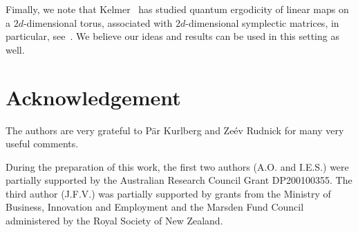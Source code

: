 \documentclass[12pt]{amsart}
\begin{document}
Fimally, we note that Kelmer~\cite{Kel}  has studied  quantum ergodicity of linear maps on a  $2d$-dimensional  torus, associated with   $2d$-dimensional symplectic 
matrices, in particular, see~\cite[Propositions~3.5 and 3.6]{Kel}.  
We believe our ideas and results can be used in this setting as well.  


\section*{Acknowledgement}

The authors are very grateful to  P{\"a}r Kurlberg and Ze{\'e}v Rudnick for many 
very useful comments.  

During the preparation of this work, the first two authors (A.O. and I.E.S.) were partially supported by the
Australian Research Council Grant DP200100355. The third author (J.F.V.) was partially supported by grants from the Ministry of Business, Innovation and Employment   and the Marsden Fund Council administered by the Royal Society of New Zealand.
 
\end{document}
